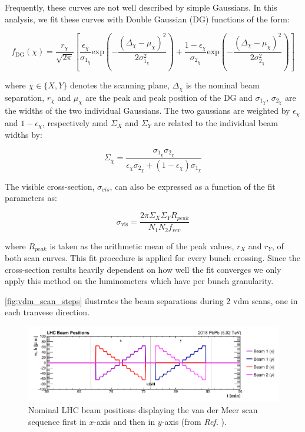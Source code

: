 Frequently, these curves are not well described by simple Gaussians. In this analysis, we fit these curves with Double Gaussian (DG) functions of the form:

\begin{equation}
    f_{\text{DG}}(\chi) = 
    \frac{r_{\chi}}{\sqrt{2\pi}} 
    \left[ 
        \frac{\epsilon_{\chi}}{\sigma_{1_{\chi}}} \text{exp} \left( -\frac{\left( \Delta_{\chi} - \mu_{\chi} \right)^2}{2\sigma^2_{1_{\chi}}} \right) +
        \frac{1 - \epsilon_{\chi}}{\sigma_{2_{\chi}}} \text{exp} \left( -\frac{\left( \Delta_{\chi} - \mu_{\chi} \right)^2}{2\sigma^2_{2_{\chi}}} \right)
    \right]
    \label{eq:double_gaussian_model}
\end{equation}

where $\chi \in \{X, Y\}$ denotes the scanning plane, $\Delta_{\chi}$ is the nominal beam separation, $r_{\chi}$ and $\mu_{\chi}$ are the peak and peak position of the DG and $\sigma_{1_{\chi}}$, $\sigma_{2_{\chi}}$ are the widths of the two individual Gaussians. The two gaussians are weighted by $\epsilon_{\chi}$ and $1 - \epsilon_{\chi}$, respectively amd $\Sigma_{X}$ and $\Sigma_{Y}$ are related to the individual beam widths by: 

\begin{equation}
    \Sigma_{\chi} = \frac{\sigma_{1_{\chi}}\sigma_{2_{\chi}}}{\epsilon_{\chi}\sigma_{2_{\chi}} + \left( 1 - \epsilon_{\chi}\right) \sigma_{1_{\chi}}}
\end{equation}

The visible cross-section, $\sigma_{vis}$, can also be expressed as a function of the fit parameters as:

\begin{equation}
    \sigma_{\mathrm{vis}} =  \frac{2\pi \Sigma_{X} \Sigma_{Y} R_{peak}}{N_1 N_2 f_{rev}}
    \label{eq:calibration_from_fit_parameters}
\end{equation}

where $R_{peak}$ is taken as the arithmetic mean of the peak values, $r_X$ and $r_Y$, of both scan curves. This fit procedure is applied for every bunch crossing. Since the cross-section results heavily dependent on how well the fit converges we only apply this method on the luminometers which have per bunch granularity.

\autoref{fig:vdm_scan_steps} ilustrates the beam separations during 2 vdm scans, one in each tranvese direction.

\begin{figure}[!htb]
	\centering
	\includegraphics[width=\textwidth]{images/assets/vdm_scan_steps.png}
	\caption{Nominal LHC beam positions displaying the van der Meer scan sequence first in $x$-axis and then in $y$-axis (from \textit{Ref.} \cite{Saariokari:2826125}).}
	\label{fig:vdm_scan_steps}
\end{figure}


